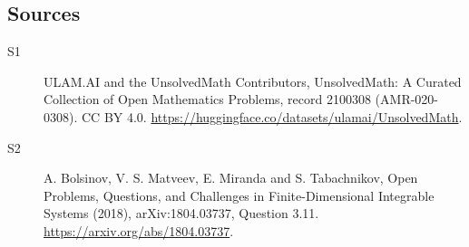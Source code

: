 \documentclass[11pt]{article}
\begin{document}
\subsection{Sources}
\begin{description}
\item[\hypertarget{source:2100308:1}{S1}] ULAM.AI and the UnsolvedMath Contributors, UnsolvedMath: A Curated Collection of Open Mathematics Problems, record 2100308 (AMR-020-0308). CC BY 4.0. \url{https://huggingface.co/datasets/ulamai/UnsolvedMath}.
\item[\hypertarget{source:2100308:2}{S2}] A. Bolsinov, V. S. Matveev, E. Miranda and S. Tabachnikov, Open Problems, Questions, and Challenges in Finite-Dimensional Integrable Systems (2018), arXiv:1804.03737, Question 3.11. \url{https://arxiv.org/abs/1804.03737}.
\end{description}
\label{end:2100308}
\end{document}
